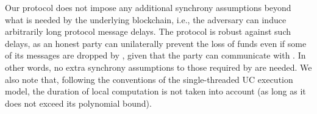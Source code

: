   Our protocol does not impose any additional synchrony assumptions beyond what
  is needed by the underlying blockchain, i.e., the adversary can induce
  arbitrarily long protocol message delays. The protocol is robust against such
  delays, as an
  honest party can unilaterally prevent the loss of funds even if some of its
  messages are dropped by \adversary, given that
  the party can communicate with \ledger. In other words, no
  extra synchrony assumptions to those required by \ledger are needed. We
  also note that,
  following the conventions of the single-threaded UC execution model, the duration of local
  computation is not taken into account (as long as it does not
  exceed its polynomial bound).
